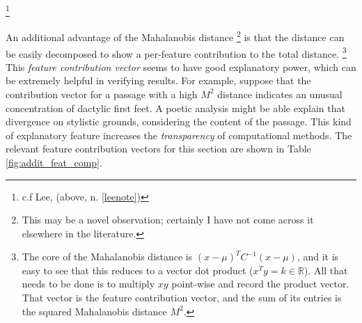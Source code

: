 \documentclass[11pt,a4paper]{scrartcl} %
\begin{document}
{\footnote{c.f Lee, (above, n. \ref{leenote})}

An additional advantage of the Mahalanobis distance%
\footnote{This may be a novel observation; certainly I have not come across it elsewhere in the literature.}
is that the distance can be easily decomposed to show a per-feature contribution to the total distance.%
\footnote{The core of the Mahalanobis distance is $(x-\mu)^{T}C^{-1}(x-\mu)$, and it is easy to see that this reduces to a vector dot product ($x^{T}y=k \in \mathbb{R}$). All that needs to be done is to multiply $xy$ point-wise and record the product vector. That vector is the feature contribution vector, and the sum of its entries is the squared Mahalanobis distance $M^{2}$.}
This \textit{feature contribution vector} seems to have good explanatory power, which can be extremely helpful in verifying results. For example, suppose that the contribution vector for a passage with a high $M^{2}$ distance indicates an unusual concentration of dactylic first feet. A poetic analysis might be able explain that divergence on stylistic grounds, considering the content of the passage. This kind of explanatory feature increases the \textit{transparency} of computational methods. The relevant feature contribution vectors for this section are shown in Table \ref{fig:addit_feat_comp}.

}
\end{document}
